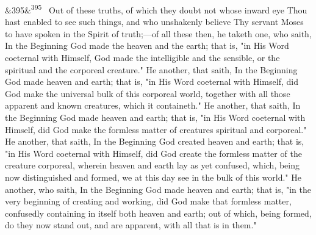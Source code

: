 \documentclass[12pt]{article}
\newcommand{\para}[1][]{\par\noindent\ifx&#1&\else\textsuperscript{\footnotesize #1}~\fi}
\begin{document}
\para[395] Out of these truths, of which they doubt not whose inward eye Thou hast enabled to see such things, and who unshakenly believe Thy servant Moses to have spoken in the Spirit of truth;---of all these then, he taketh one, who saith, In the Beginning God made the heaven and the earth; that is, "in His Word coeternal with Himself, God made the intelligible and the sensible, or the spiritual and the corporeal creature." He another, that saith, In the Beginning God made heaven and earth; that is, "in His Word coeternal with Himself, did God make the universal bulk of this corporeal world, together with all those apparent and known creatures, which it containeth." He another, that saith, In the Beginning God made heaven and earth; that is, "in His Word coeternal with Himself, did God make the formless matter of creatures spiritual and corporeal." He another, that saith, In the Beginning God created heaven and earth; that is, "in His Word coeternal with Himself, did God create the formless matter of the creature corporeal, wherein heaven and earth lay as yet confused, which, being now distinguished and formed, we at this day see in the bulk of this world." He another, who saith, In the Beginning God made heaven and earth; that is, "in the very beginning of creating and working, did God make that formless matter, confusedly containing in itself both heaven and earth; out of which, being formed, do they now stand out, and are apparent, with all that is in them."
\end{document}
